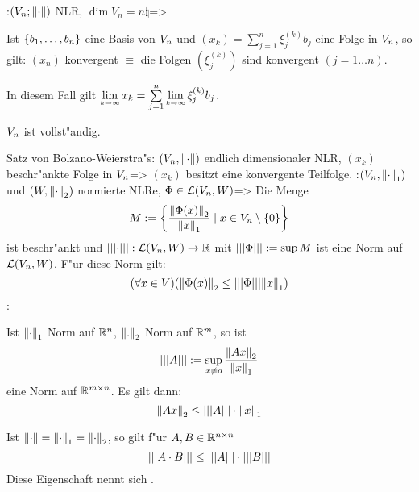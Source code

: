 \theorem:$(V_n;{\left\| \cdot\right\|})$ NLR, $\dim V_n=n\natural$=>{
  \begin{stmts}
    \item
      Ist $\{b_1,\ldots,b_n\}$ eine Basis von $V_n$ und 
      $(x_k)=\sum_{j=1}^n \xi_j^{(k)} b_j$ eine Folge in $V_n$, so gilt:
      $(x_n)$ konvergent $\equiv$ die Folgen $(\xi_j^{(k)})$ sind konvergent 
      $(j=1\ldots n)$. 
      
      In diesem Fall gilt 
      $\limes k->\infty x_k=\sum_{j=1}^n \limes k->\infty \xi_j^{(k)} b_j$.
    \item
      $V_n$ ist vollst"andig.
    \end{stmts}
  }
\theorem Satz von Bolzano-Weierstra"s:
  $(V_n,{\left\| \cdot\right\|})$ endlich dimensionaler NLR, 
  $(x_k)$ beschr"ankte Folge in $V_n$=>{
    $(x_k)$ besitzt eine konvergente Teilfolge.
  }
\theorem:$(V_n,{\left\| \cdot\right\|}_1)$ und $(W,{\left\| \cdot\right\|}_2)$ normierte NLRe, 
  $\Phi\in\mathcal{L}(V_n,W)$=>{
  Die Menge 
  \[M:=\left\{\frac{{\left\| \Phi(x)\right\|}_2}{{\left\| x\right\|}_1} \mid x\in V_n\setminus \{0\} \right\}
    \]
  ist beschr"ankt und ${\left|\left|\left|\cdot\right|\right|\right|}: \mathcal{L}(V_n,W)\to\mathbb R$ mit
  ${\left|\left|\left|\Phi\right|\right|\right|}:=\sup M$ ist eine Norm auf $\mathcal{L}(V_n,W)$.
  F"ur diese Norm gilt:
  \[(\forall x\in V)({\left\| \Phi(x)\right\|}_2\leq{\left|\left|\left|\Phi\right|\right|\right|}{\left\| x\right\|}_1)
    \]
}
\remark:{
  Ist ${\left\| \cdot\right\|}_1$ Norm auf $\mathbb R^n$, ${\left\| .\right\|}_2$ Norm auf $\mathbb R^m$, so
  ist 
  \[{\left|\left|\left|A\right|\right|\right|}:=\sup_{x\neq o}\frac{{\left\| Ax\right\|}_2}{{\left\| x\right\|}_1}
    \] 
  eine Norm auf $\mathbb R^{m\times n}$. Es gilt dann: 
  \[{\left\| Ax\right\|}_2 \leq {\left|\left|\left|A\right|\right|\right|} \cdot {\left\| x\right\|}_1
    \]
  
  Ist ${\left\| \cdot\right\|}={\left\| \cdot\right\|}_1={\left\| \cdot\right\|}_2$, so gilt f"ur $A,B\in\mathbb R^{n\times n}$
  \[{\left|\left|\left|A\cdot B\right|\right|\right|}\leq {\left|\left|\left|A\right|\right|\right|} \cdot {\left|\left|\left|B\right|\right|\right|}
    \]
  Diese Eigenschaft nennt sich .
  }
